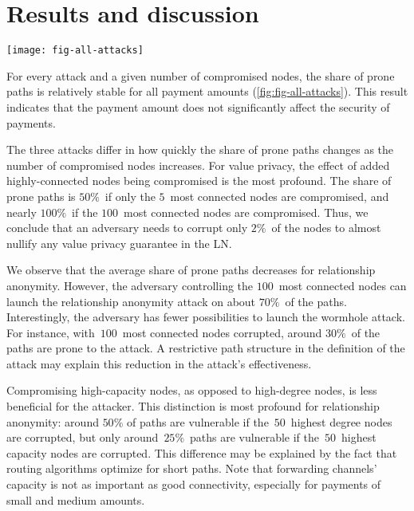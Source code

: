 \section{Results and discussion}

\begin{figure*}
	\centering
	\texttt{[image: fig-all-attacks]}
	\caption{Share of prone paths for each parameter combination.}
	\label{fig:fig-all-attacks}
\end{figure*}

For every attack and a given number of compromised nodes, the share of prone paths is relatively stable for all payment amounts (\cref{fig:fig-all-attacks}).
This result indicates that the payment amount does not significantly affect the security of payments.

The three attacks differ in how quickly the share of prone paths changes as the number of compromised nodes increases.
For value privacy, the effect of added highly-connected nodes being compromised is the most profound.
The share of prone paths is $50\%$~if only the $5$~most connected nodes are compromised, and nearly $100\%$~if the $100$~most connected nodes are compromised.
Thus, we conclude that an adversary needs to corrupt only $2\%$~of the nodes to almost nullify any value privacy guarantee in the LN\@.

We observe that the average share of prone paths decreases for relationship anonymity.
However, the adversary controlling the $100$~most connected nodes can launch the relationship anonymity attack on about $70\%$~of the paths.
Interestingly, the adversary has fewer possibilities to launch the wormhole attack.
For instance, with~$100$~most connected nodes corrupted, around $30\%$~of the paths are prone to the attack.
A restrictive path structure in the definition of the attack may explain this reduction in the attack's effectiveness.

Compromising high-capacity nodes, as opposed to high-degree nodes, is less beneficial for the attacker.
This distinction is most profound for relationship anonymity: around $50\%$ of paths are vulnerable if the~$50$~highest degree nodes are corrupted, but only around~$25\%$~paths are vulnerable if the~$50$~highest capacity nodes are corrupted.
This difference may be explained by the fact that routing algorithms optimize for short paths.
Note that forwarding channels' capacity is not as important as good connectivity, especially for payments of small and medium amounts.

